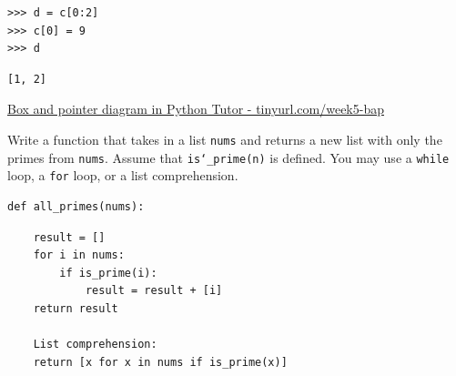 \documentclass{exam}
\begin{document}
\begin{questions}
\begin{blocksection}
\begin{lstlisting}
>>> d = c[0:2]
>>> c[0] = 9
>>> d
\end{lstlisting}
\begin{solution}
\begin{lstlisting}
[1, 2]
\end{lstlisting}
\end{solution}

\begin{solution}
\href{http://goo.gl/Gxe0qv}{Box and pointer diagram in Python Tutor -  tinyurl.com/week5-bap}
\end{solution}
\end{blocksection}


\begin{blocksection}
\question Write a function that takes in a list \texttt{nums} and returns a
new list with only the primes from \texttt{nums}. Assume that
\texttt{is\char`_prime(n)} is defined. You may use a \texttt{while} loop, a
\texttt{for} loop, or a list comprehension.

\begin{lstlisting}
def all_primes(nums):
\end{lstlisting}
\begin{solution}[2in]
\begin{lstlisting}
    result = []
    for i in nums:
        if is_prime(i):
            result = result + [i]
    return result

    List comprehension:
    return [x for x in nums if is_prime(x)]
\end{lstlisting}
\end{solution}
\end{blocksection}
\end{questions}

\end{document}
